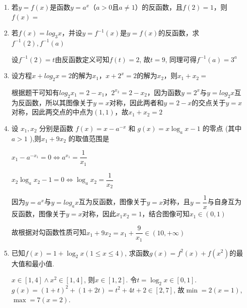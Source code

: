 \begin{enumerate}
    上述命题中正确命题的个数是\dotfill()
    \begin{jieda}
    令$f(x)=\lg\frac{x}{100}$. 
    \end{jieda}
    \item 若$y = f(x)$是函数$y = a^x$（$a > 0$且$a \neq 1$）的反函数，且$f(2) = 1$，则$f(x) = $
    \item 若$f(x) = log_3x$，并设$y = f^{-1}(x)$是$y = f(x)$的反函数，求$f^{-1}(2), f^{-1}(a)$
    \begin{jieda}
        设$f^{-1}(2)=t$由反函数定义可知$f(t) = 2$, 故$t = 9$, 同理可得$f^{-1}(a) = 3^a$
    \end{jieda}
    \item 设方程$x+log_2x = 2$的解为$x_1$，$x  + 2^x = 2$的解为$x_2$，则$x_1+x_2 = $
    \begin{jieda}
        根据题干可知有$log_2x_1 = 2-x_1$，$2^{x_2} = 2-x_2$，因为函数$y = 2^x$与$y = log_2x$互为反函数，所以其图像关于$y = x$对称，因此两者和$y = 2-x$的交点关于$y = x$对称，因此两交点的中点为$(1, 1)$，故$x_1+x_2 = 2$
    \end{jieda}
    \item 设 ${x}_{1},{x}_{2}$ 分别是函数 $f\left( x\right)  = x - {a}^{-x}$ 和 $g\left( x\right)  = x{\log }_{a}x - 1$ 的零点 (其中 $a > 1$ ),则${x}_{1} + 9{x}_{2}$ 的取值范围是
    \begin{jieda}
        $x_1 - {a}^{-x_1} = 0 \Longleftrightarrow a^{x_1} = \dfrac{1}{x_1}$

        $x_2{\log }_{a}x_2 - 1 = 0 \Longleftrightarrow {\log }_{a}x_2 = \dfrac{1}{x_2}$

        因为$y = a^x$与$y = log_ax$互为反函数，图像关于$y = x$对称，且$y = \dfrac{1}{x}$与自身互为反函数，图像关于$y = x$对称，因此$x_1x_2 = 1$，结合图像可知$x_1 \in (0, 1)$

        故根据对勾函数性质可知${x}_{1} + 9{x}_{2} = x_1 + \dfrac{9}{x_1} \in (10, +\infty)$
    \end{jieda}
    \item 已知$f(x)=1+\log_2x(1\leq x\leq 4)$, 求函数$g(x)=f^2(x)+f(x^2)$的最大值和最小值. 
    \begin{jieda}
    $x\in[1,4]\land x^2\in[1,4]$, 则$x\in[1,2]$. 令$t=\log_2x\in[0,1]$. \\
    $g(x)=(1+t)^2+(1+2t)=t^2+4t+2\in[2,7]$, 故$\min=2(x=1)$, $\max=7(x=2)$. 
    \end{jieda}
    

\end{enumerate}
